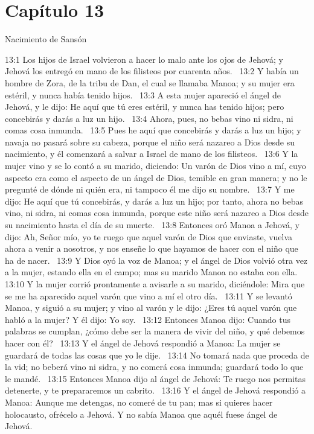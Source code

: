 \section*{Capítulo 13}
Nacimiento de Sansón  

13:1 Los hijos de Israel volvieron a hacer lo malo ante los ojos de Jehová; y Jehová los entregó en mano de los filisteos por cuarenta años.  
13:2 Y había un hombre de Zora, de la tribu de Dan, el cual se llamaba Manoa; y su mujer era estéril, y nunca había tenido hijos.  
13:3 A esta mujer apareció el ángel de Jehová, y le dijo: He aquí que tú eres estéril, y nunca has tenido hijos; pero concebirás y darás a luz un hijo.  
13:4 Ahora, pues, no bebas vino ni sidra, ni comas cosa inmunda.  
13:5 Pues he aquí que concebirás y darás a luz un hijo; y navaja no pasará sobre su cabeza, porque el niño será nazareo a Dios desde su nacimiento, y él comenzará a salvar a Israel de mano de los filisteos.  
13:6 Y la mujer vino y se lo contó a su marido, diciendo: Un varón de Dios vino a mí, cuyo aspecto era como el aspecto de un ángel de Dios, temible en gran manera; y no le pregunté de dónde ni quién era, ni tampoco él me dijo su nombre.  
13:7 Y me dijo: He aquí que tú concebirás, y darás a luz un hijo; por tanto, ahora no bebas vino, ni sidra, ni comas cosa inmunda, porque este niño será nazareo a Dios desde su nacimiento hasta el día de su muerte.  
13:8 Entonces oró Manoa a Jehová, y dijo: Ah, Señor mío, yo te ruego que aquel varón de Dios que enviaste, vuelva ahora a venir a nosotros, y nos enseñe lo que hayamos de hacer con el niño que ha de nacer.  
13:9 Y Dios oyó la voz de Manoa; y el ángel de Dios volvió otra vez a la mujer, estando ella en el campo; mas su marido Manoa no estaba con ella.  
13:10 Y la mujer corrió prontamente a avisarle a su marido, diciéndole: Mira que se me ha aparecido aquel varón que vino a mí el otro día.  
13:11 Y se levantó Manoa, y siguió a su mujer; y vino al varón y le dijo: ¿Eres tú aquel varón que habló a la mujer? Y él dijo: Yo soy.  
13:12 Entonces Manoa dijo: Cuando tus palabras se cumplan, ¿cómo debe ser la manera de vivir del niño, y qué debemos hacer con él?  
13:13 Y el ángel de Jehová respondió a Manoa: La mujer se guardará de todas las cosas que yo le dije.  
13:14 No tomará nada que proceda de la vid; no beberá vino ni sidra, y no comerá cosa inmunda; guardará todo lo que le mandé.  
13:15 Entonces Manoa dijo al ángel de Jehová: Te ruego nos permitas detenerte, y te prepararemos un cabrito.  
13:16 Y el ángel de Jehová respondió a Manoa: Aunque me detengas, no comeré de tu pan; mas si quieres hacer holocausto, ofrécelo a Jehová. Y no sabía Manoa que aquél fuese ángel de Jehová.  
